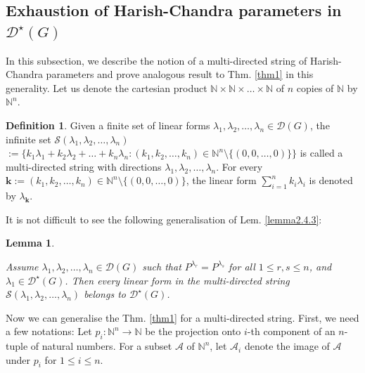 \documentclass[11 pt]{amsart}
\newcommand{\N}{{\mathbb N}}
\newtheorem{lemma}[theorem]{Lemma}
\theoremstyle{definition}
\newtheorem{definition}[theorem]{Definition}
\numberwithin{equation}{section}
\begin{document}
\subsection{Exhaustion of Harish-Chandra parameters in $\mathcal{D}^{\star}(G)$}\label{exhaustion}
In this subsection, we describe the notion of a multi-directed string of Harish-Chandra parameters and prove analogous result to Thm. \ref{thm1} in this generality. Let us denote the cartesian product $\N \times \N \times \dots \times \N$ of $n$ copies of $\N$ by $\N^n$.

\begin{definition}\label{multi-directed}
Given a finite set of linear forms $\lambda_1, \lambda_2,\dots ,\lambda_n \in \mathcal{D}(G)$, the infinite set $\mathcal{S}(\lambda_1, \lambda_2, \dots, \lambda_n)$ $:=\{ k_1 \lambda_1 + k_2 \lambda_2 + \dots + k_n \lambda_n : (k_1, k_2, \dots ,k_n) \in \N^n \setminus \{(0,0, \dots ,0)\} \}$ is called a multi-directed string with directions $\lambda_1, \lambda_2, \dots, \lambda_n$. For every $\boldsymbol{k}:= (k_1, k_2, \dots ,k_n) \in \N^n \setminus \{(0,0, \dots ,0)\} $, the linear form $\sum\limits_{i=1}^{n} k_i \lambda_i$ is denoted by $\lambda_{\boldsymbol{k}}$. 
\end{definition}

\noindent It is not difficult to see the following generalisation of Lem. \ref{lemma2.4.3}: 
\vspace{2pt}
\begin{lemma}\label{lem-grid}

\textit{Assume $\lambda_1, \lambda_2, \dots , \lambda_n \in \mathcal{D}(G)$ such that $P^{\lambda_r}=P^{\lambda_s}$ for all $1 \leq r, s \leq n$, and $\lambda_1 \in \mathcal{D}^{\star}(G)$. Then every linear form in the multi-directed string $\mathcal{S}(\lambda_1, \lambda_2, \dots ,\lambda_n)$ belongs to $\mathcal{D}^{\star}(G)$.}

\end{lemma}

  Now we can generalise the Thm. \ref{thm1} for a multi-directed string. First, we need a few notations: Let $p_i : \N^n \longrightarrow \N$ be the projection onto $i$-th component of an $n$-tuple of natural numbers. For a subset $\boldsymbol{\mathcal{A}}$ of $\N^n$, let $\mathcal{A}_i$ denote the image of $\boldsymbol{\mathcal{A}}$ under $p_i$ for $1 \leq i \leq n$.
\end{document}
